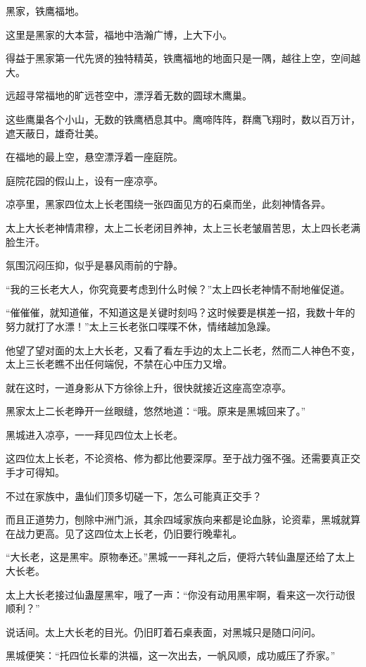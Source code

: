 
\begin{this_body}

黑家，铁鹰福地。

这里是黑家的大本营，福地中浩瀚广博，上大下小。

得益于黑家第一代先贤的独特精英，铁鹰福地的地面只是一隅，越往上空，空间越大。

远超寻常福地的旷远苍空中，漂浮着无数的圆球木鹰巢。

这些鹰巢各个小山，无数的铁鹰栖息其中。鹰啼阵阵，群鹰飞翔时，数以百万计，遮天蔽日，雄奇壮美。

在福地的最上空，悬空漂浮着一座庭院。

庭院花园的假山上，设有一座凉亭。

凉亭里，黑家四位太上长老围绕一张四面见方的石桌而坐，此刻神情各异。

太上大长老神情肃穆，太上二长老闭目养神，太上三长老皱眉苦思，太上四长老满脸生汗。

氛围沉闷压抑，似乎是暴风雨前的宁静。

“我的三长老大人，你究竟要考虑到什么时候？”太上四长老神情不耐地催促道。

“催催催，就知道催，不知道这是关键时刻吗？这时候要是棋差一招，我数十年的努力就打了水漂！”太上三长老张口喋喋不休，情绪越加急躁。

他望了望对面的太上大长老，又看了看左手边的太上二长老，然而二人神色不变，太上三长老瞧不出任何端倪，不禁在心中压力又增。

就在这时，一道身影从下方徐徐上升，很快就接近这座高空凉亭。

黑家太上二长老睁开一丝眼缝，悠然地道：“哦。原来是黑城回来了。”

黑城进入凉亭，一一拜见四位太上长老。

这四位太上长老，不论资格、修为都比他要深厚。至于战力强不强。还需要真正交手才可得知。

不过在家族中，蛊仙们顶多切磋一下，怎么可能真正交手？

而且正道势力，刨除中洲门派，其余四域家族向来都是论血脉，论资辈，黑城就算在战力更高。见了这四位太上长老，仍旧要行晚辈礼。

“大长老，这是黑牢。原物奉还。”黑城一一拜礼之后，便将六转仙蛊屋还给了太上大长老。

太上大长老接过仙蛊屋黑牢，哦了一声：“你没有动用黑牢啊，看来这一次行动很顺利？”

说话间。太上大长老的目光。仍旧盯着石桌表面，对黑城只是随口问问。

黑城便笑：“托四位长辈的洪福，这一次出去，一帆风顺，成功威压了乔家。”


\end{this_body}
